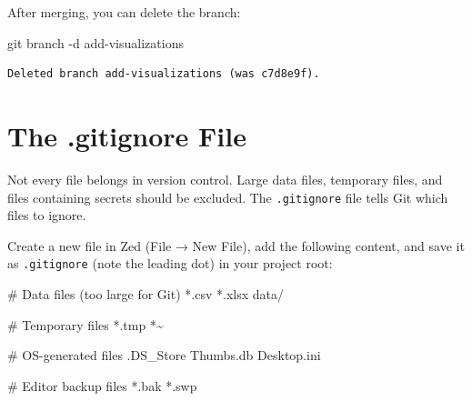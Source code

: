 \documentclass[
  letterpaper,
  DIV=11,
  numbers=noendperiod]{scrreprt}
\newenvironment{Shaded}{\begin{snugshade}}{\end{snugshade}}
\newcommand{\AttributeTok}[1]{\textcolor[rgb]{0.40,0.45,0.13}{#1}}
\newcommand{\CommentTok}[1]{\textcolor[rgb]{0.37,0.37,0.37}{#1}}
\newcommand{\ExtensionTok}[1]{\textcolor[rgb]{0.00,0.23,0.31}{#1}}
\newcommand{\FunctionTok}[1]{\textcolor[rgb]{0.28,0.35,0.67}{#1}}
\newcommand{\NormalTok}[1]{\textcolor[rgb]{0.00,0.23,0.31}{#1}}
\begin{document}
After merging, you can delete the branch:

\begin{codelisting}

\caption{\texttt{terminal}}

\begin{Shaded}
\begin{Highlighting}[]
\FunctionTok{git}\NormalTok{ branch }\AttributeTok{{-}d}\NormalTok{ add{-}visualizations}
\end{Highlighting}
\end{Shaded}

\end{codelisting}

\begin{verbatim}
Deleted branch add-visualizations (was c7d8e9f).
\end{verbatim}

\section{The .gitignore File}\label{the-.gitignore-file}

Not every file belongs in version control. Large data files, temporary
files, and files containing secrets should be excluded. The
\texttt{.gitignore} file tells Git which files to ignore.

Create a new file in Zed (File → New File), add the following content,
and save it as \texttt{.gitignore} (note the leading dot) in your
project root:

\begin{codelisting}

\caption{\texttt{.gitignore}}

\begin{Shaded}
\begin{Highlighting}[]
\CommentTok{\# Data files (too large for Git)}
\ExtensionTok{*.csv}
\ExtensionTok{*.xlsx}
\ExtensionTok{data/}

\CommentTok{\# Temporary files}
\ExtensionTok{*.tmp}
\ExtensionTok{*\textasciitilde{}}

\CommentTok{\# OS{-}generated files}
\ExtensionTok{.DS\_Store}
\ExtensionTok{Thumbs.db}
\ExtensionTok{Desktop.ini}

\CommentTok{\# Editor backup files}
\ExtensionTok{*.bak}
\ExtensionTok{*.swp}
\end{Highlighting}
\end{Shaded}

\end{codelisting}
\end{document}
